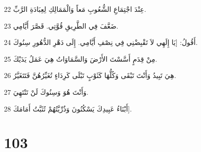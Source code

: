 \par 22 عِنْدَ اجْتِمَاعِ الشُّعُوبِ مَعاً وَالْمَمَالِكِ لِعِبَادَةِ الرَّبِّ.
\par 23 ضَعَّفَ فِي الطَّرِيقِ قُوَّتِي. قَصَّرَ أَيَّامِي.
\par 24 أَقُولُ: [يَا إِلَهِي لاَ تَقْبِضْنِي فِي نِصْفِ أَيَّامِي. إِلَى دَهْرِ الدُّهُورِ سِنُوكَ.
\par 25 مِنْ قِدَمٍ أَسَّسْتَ الأَرْضَ وَالسَّمَاوَاتُ هِيَ عَمَلُ يَدَيْكَ.
\par 26 هِيَ تَبِيدُ وَأَنْتَ تَبْقَى وَكُلُّهَا كَثَوْبٍ تَبْلَى كَرِدَاءٍ تُغَيِّرُهُنَّ فَتَتَغَيَّرُ.
\par 27 وَأَنْتَ هُوَ وَسِنُوكَ لَنْ تَنْتَهِيَ.
\par 28 أَبْنَاءُ عَبِيدِكَ يَسْكُنُونَ وَذُرِّيَّتُهُمْ تُثَبَّتُ أَمَامَكَ].

\chapter{103}

